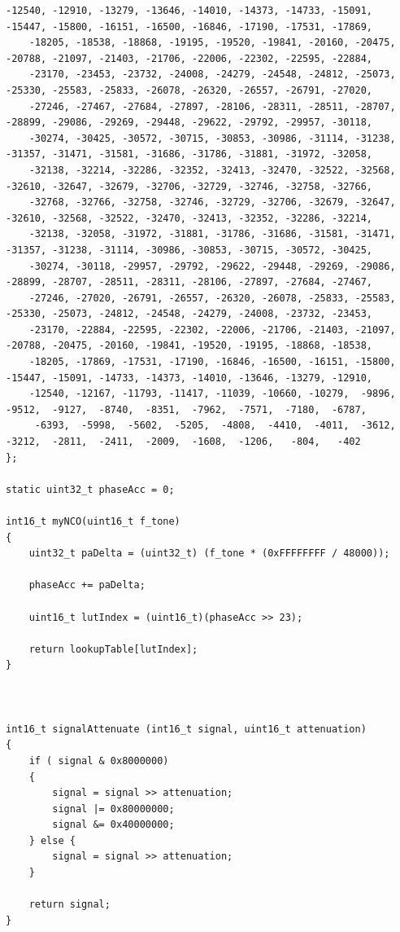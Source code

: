 \documentclass[11pt,pdftex,portrait,letterpaper]{article}
\begin{document}
\begin{lstlisting}[caption={myNCO}, label=l:myNCO]
    -12540, -12910, -13279, -13646, -14010, -14373, -14733, -15091, -15447, -15800, -16151, -16500, -16846, -17190, -17531, -17869,
    -18205, -18538, -18868, -19195, -19520, -19841, -20160, -20475, -20788, -21097, -21403, -21706, -22006, -22302, -22595, -22884,
    -23170, -23453, -23732, -24008, -24279, -24548, -24812, -25073, -25330, -25583, -25833, -26078, -26320, -26557, -26791, -27020,
    -27246, -27467, -27684, -27897, -28106, -28311, -28511, -28707, -28899, -29086, -29269, -29448, -29622, -29792, -29957, -30118,
    -30274, -30425, -30572, -30715, -30853, -30986, -31114, -31238, -31357, -31471, -31581, -31686, -31786, -31881, -31972, -32058,
    -32138, -32214, -32286, -32352, -32413, -32470, -32522, -32568, -32610, -32647, -32679, -32706, -32729, -32746, -32758, -32766,
    -32768, -32766, -32758, -32746, -32729, -32706, -32679, -32647, -32610, -32568, -32522, -32470, -32413, -32352, -32286, -32214,
    -32138, -32058, -31972, -31881, -31786, -31686, -31581, -31471, -31357, -31238, -31114, -30986, -30853, -30715, -30572, -30425,
    -30274, -30118, -29957, -29792, -29622, -29448, -29269, -29086, -28899, -28707, -28511, -28311, -28106, -27897, -27684, -27467,
    -27246, -27020, -26791, -26557, -26320, -26078, -25833, -25583, -25330, -25073, -24812, -24548, -24279, -24008, -23732, -23453,
    -23170, -22884, -22595, -22302, -22006, -21706, -21403, -21097, -20788, -20475, -20160, -19841, -19520, -19195, -18868, -18538,
    -18205, -17869, -17531, -17190, -16846, -16500, -16151, -15800, -15447, -15091, -14733, -14373, -14010, -13646, -13279, -12910,
    -12540, -12167, -11793, -11417, -11039, -10660, -10279,  -9896,  -9512,  -9127,  -8740,  -8351,  -7962,  -7571,  -7180,  -6787,
     -6393,  -5998,  -5602,  -5205,  -4808,  -4410,  -4011,  -3612,  -3212,  -2811,  -2411,  -2009,  -1608,  -1206,   -804,   -402
};

static uint32_t phaseAcc = 0;

int16_t myNCO(uint16_t f_tone)
{
	uint32_t paDelta = (uint32_t) (f_tone * (0xFFFFFFFF / 48000));

	phaseAcc += paDelta;

	uint16_t lutIndex = (uint16_t)(phaseAcc >> 23);

	return lookupTable[lutIndex];
}



int16_t signalAttenuate (int16_t signal, uint16_t attenuation)
{
	if ( signal & 0x8000000)
	{
		signal = signal >> attenuation;
		signal |= 0x80000000;
		signal &= 0x40000000;
	} else {
		signal = signal >> attenuation;
	}

	return signal;
}
\end{lstlisting}
\end{document}

